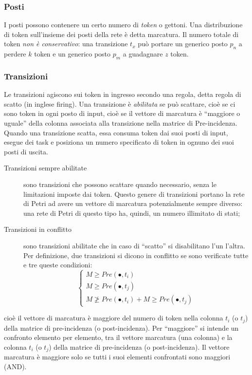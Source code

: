 \documentclass[a4paper]{report}
\begin{document}
\subsubsection{Posti}
I posti possono contenere un certo numero di {\em
  token} o gettoni. Una distribuzione di
token sull'insieme dei posti della rete \`e detta marcatura.
Il numero totale di token
{\em non \`e conservativo}: una transizione $t_x$ pu\`o portare un generico
posto $p_n$ a perdere $k$ token e un generico posto $p_m$ a guadagnare
$z$ token.
\subsubsection{Transizioni}
Le transizioni agiscono sui token in ingresso secondo una regola, detta
regola di scatto (in inglese firing). Una transizione \`e {\em
  abilitata} se pu\`o scattare, cio\`e se ci sono token in ogni posto
di input, cio\`e se il vettore di marcatura \`e ``maggiore o uguale''
della colonna associata alla transizione nella matrice di
Pre-incidenza. Quando una transizione scatta, essa consuma token dai suoi
posti di input, esegue dei task e posiziona un numero specificato di
token in ognuno dei suoi posti di uscita. 
\begin{description}
\item[Transizioni sempre abilitate] sono transizioni che possono
  scattare quando necessario, senza le limitazioni imposte dai
  token. Questo genere di transizioni portano la rete di Petri ad
  avere un vettore di marcatura potenzialmente sempre diverso: una
  rete di Petri di questo tipo ha, quindi, un numero illimitato di stati;
\item[Transizioni in conflitto] sono transizioni abilitate che in caso
  di ``scatto'' si disabilitano l'un l'altra. Per definizione, due
  transizioni si dicono in conflitto se sono verificate tutte e tre
  queste condizioni:
  \[
  \left \{
  \begin{array}{l}
    M \geq Pre(\bullet, t_i)\\
    M \geq Pre(\bullet, t_j)\\
    M \ngeq Pre(\bullet, t_i) + M \geq Pre(\bullet, t_j)
  \end{array}
  \right .
  \]
\end{description}
cio\`e il vettore di marcatura \`e maggiore del numero di token nella
colonna $t_i$ (o $t_j$) della matrice di pre-incidenza (o
post-incidenza). Per ``maggiore'' si intende un confronto elemento per
elemento, tra il vettore marcatura (una colonna) e la colonna $t_i$ (o
$t_j$) della matrice di pre-incidenza (o post-incidenza). Il vettore
marcatura \`e maggiore solo se tutti i suoi elementi confrontati sono
maggiori (AND).
\end{document}

